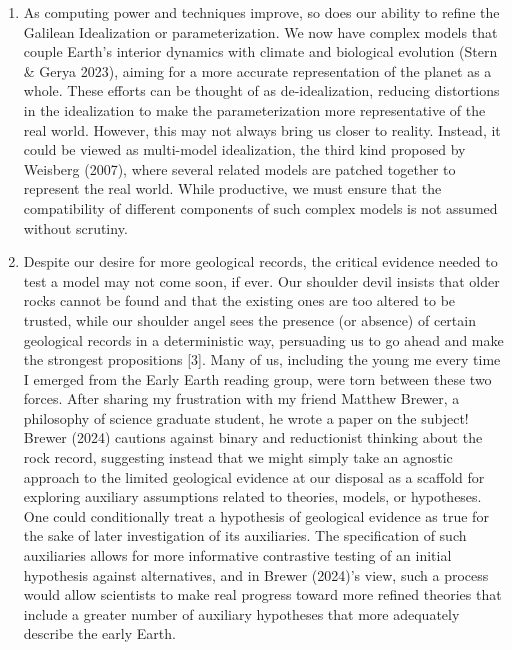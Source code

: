 \documentclass[11pt]{article}
\begin{document}
\begin{enumerate}

\item As computing power and techniques improve, so does our ability to refine the Galilean Idealization or parameterization. We now have complex models that couple Earth's interior dynamics with climate and biological evolution (Stern \& Gerya 2023), aiming for a more accurate representation of the planet as a whole. These efforts can be thought of as de-idealization, reducing distortions in the idealization to make the parameterization more representative of the real world. However, this may not always bring us closer to reality. Instead, it could be viewed as multi-model idealization, the third kind proposed by Weisberg (2007), where several related models are patched together to represent the real world. While productive, we must ensure that the compatibility of different components of such complex models is not assumed without scrutiny.

\item Despite our desire for more geological records, the critical evidence needed to test a model may not come soon, if ever. Our shoulder devil insists that older rocks cannot be found and that the existing ones are too altered to be trusted, while our shoulder angel sees the presence (or absence) of certain geological records in a deterministic way, persuading us to go ahead and make the strongest propositions [3]. Many of us, including the young me every time I emerged from the Early Earth reading group, were torn between these two forces. After sharing my frustration with my friend Matthew Brewer, a philosophy of science graduate student, he wrote a paper on the subject! Brewer (2024) cautions against binary and reductionist thinking about the rock record, suggesting instead that we might simply take an agnostic approach to the limited geological evidence at our disposal as a scaffold for exploring auxiliary assumptions related to theories, models, or hypotheses. One could conditionally treat a hypothesis of geological evidence as true for the sake of later investigation of its auxiliaries. The specification of such auxiliaries allows for more informative contrastive testing of an initial hypothesis against alternatives, and in Brewer (2024)'s view, such a process would allow scientists to make real progress toward more refined theories that include a greater number of auxiliary hypotheses that more adequately describe the early Earth.


\end{enumerate}
\end{document}
